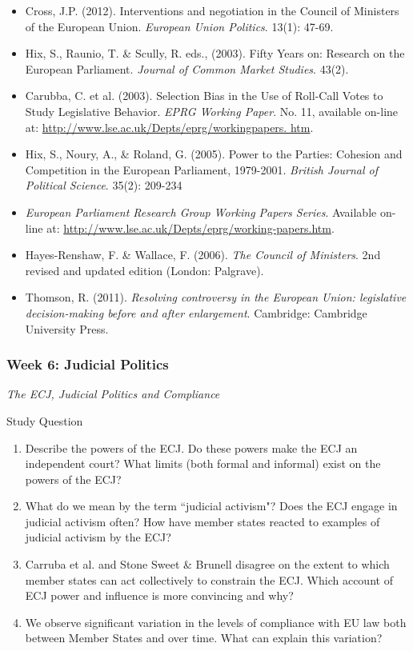 \begin{itemize}
	\item Cross, J.P. (2012). Interventions and negotiation in the Council of Ministers of the European Union. \textit{European Union Politics}. 13(1): 47-69.
	\item Hix, S., Raunio, T. \& Scully, R. eds., (2003). Fifty Years on: Research on the European Parliament. \textit{Journal of Common Market Studies}. 43(2).
	\item Carubba, C. et al. (2003). Selection Bias in the Use of Roll-Call Votes to Study Legislative Behavior. \textit{EPRG Working Paper}. No. 11, available on-line at: \url{http://www.lse.ac.uk/Depts/eprg/workingpapers.
htm}.
	\item Hix, S., Noury, A., \& Roland, G. (2005). Power to the Parties: Cohesion and Competition in the European Parliament, 1979-2001. \textit{British Journal of Political Science}. 35(2): 209-234
	\item \textit{European Parliament Research Group Working Papers Series}. Available on-line at: \url{http://www.lse.ac.uk/Depts/eprg/working-papers.htm}.
	\item Hayes-Renshaw, F. \& Wallace, F. (2006). \textit{The Council of Ministers}. 2nd revised and updated edition (London: Palgrave).
	\item Thomson, R. (2011). \textit{Resolving controversy in the European Union: legislative decision-making before and after enlargement}. Cambridge: Cambridge University Press.
\end{itemize}


\subsubsection*{Week 6: Judicial Politics}

\textit{The ECJ, Judicial Politics and Compliance}

Study Question

\begin{enumerate}
	\item Describe the powers of the ECJ. Do these powers make the ECJ an independent court? What limits (both formal and informal) exist on the powers of the ECJ?
	\item What do we mean by the term ``judicial activism"? Does the ECJ engage in judicial activism often? How have member states reacted to examples of judicial activism by the ECJ?
	\item Carruba et al. and Stone Sweet \& Brunell disagree on the extent to which member states can act collectively to constrain the ECJ. Which account of ECJ power and influence is more convincing and why?
	\item We observe significant variation in the levels of compliance with EU law both between Member States and over time. What can explain this variation?
\end{enumerate}

